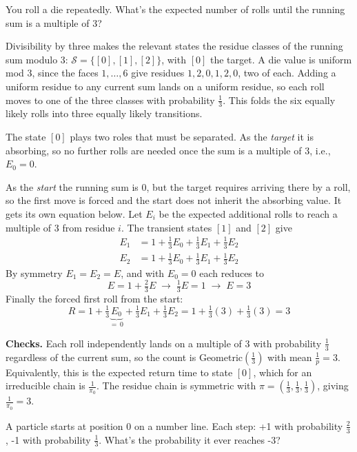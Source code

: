 \begin{problem}
You roll a die repeatedly. What's the expected number of rolls until the running sum is a multiple of 3?
\end{problem}

\begin{solution}
Divisibility by three makes the relevant states the residue classes of the running sum modulo 3: $\mathcal{S} = \{[0], [1], [2]\}$, with $[0]$ the target. A die value is uniform mod 3, since the faces $1,\dots,6$ give residues $1,2,0,1,2,0$, two of each. Adding a uniform residue to any current sum lands on a uniform residue, so each roll moves to one of the three classes with probability $\tfrac{1}{3}$. This folds the six equally likely rolls into three equally likely transitions.

The state $[0]$ plays two roles that must be separated. As the \textit{target} it is absorbing, so no further rolls are needed once the sum is a multiple of 3, i.e., $E_0 = 0$. 

As the \textit{start} the running sum is 0, but the target requires arriving there by a roll, so the first move is forced and the start does not inherit the absorbing value. It gets its own equation below. Let $E_i$ be the expected additional rolls to reach a multiple of 3 from residue $i$. The transient states $[1]$ and $[2]$ give
\begin{align*}
    E_1 &= 1 + \tfrac{1}{3}E_0 + \tfrac{1}{3}E_1 + \tfrac{1}{3}E_2 \\[1ex]
    E_2 &= 1 + \tfrac{1}{3}E_0 + \tfrac{1}{3}E_1 + \tfrac{1}{3}E_2
\end{align*}
By symmetry $E_1 = E_2 = E$, and with $E_0 = 0$ each reduces to
\[
E = 1 + \tfrac{2}{3}E \;\longrightarrow\; \tfrac{1}{3}E = 1 \;\longrightarrow\; E = 3
\]
Finally the forced first roll from the start:
\[
R = 1 + \tfrac{1}{3}\underbrace{E_0}_{=\,0} + \tfrac{1}{3}E_1 + \tfrac{1}{3}E_2 = 1 + \tfrac{1}{3}(3) + \tfrac{1}{3}(3) = 3
\]

\textbf{Checks.} Each roll independently lands on a multiple of 3 with probability $\tfrac{1}{3}$ regardless of the current sum, so the count is Geometric$(\tfrac{1}{3})$ with mean $\tfrac{1}{p} = 3$. Equivalently, this is the expected return time to state $[0]$, which for an irreducible chain is $\frac{1}{\pi_0}$. The residue chain is symmetric with $\pi = (\tfrac{1}{3}, \tfrac{1}{3}, \tfrac{1}{3})$, giving $\frac{1}{\pi_0} = 3$.
\end{solution}

\begin{problem}
A particle starts at position 0 on a number line. Each step: +1 with probability $\frac{2}{3}$, -1 with probability $\frac{1}{3}$. What's the probability it ever reaches -3?
\end{problem}

